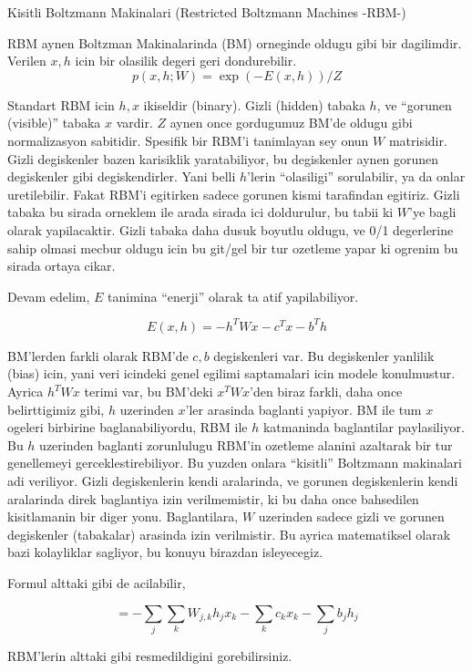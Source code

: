 \documentclass[12pt,fleqn]{article}\usepackage{../common}
\begin{document}
Kisitli Boltzmann Makinalari (Restricted Boltzmann Machines -RBM-)

RBM aynen Boltzman Makinalarinda (BM) orneginde oldugu gibi bir
dagilimdir. Verilen $x,h$ icin bir olasilik degeri geri dondurebilir.
$$ p(x,h;W) = \exp (-E(x,h)) / Z $$

Standart RBM icin $h,x$ ikiseldir (binary). Gizli (hidden) tabaka $h$, ve
``gorunen (visible)'' tabaka $x$ vardir. $Z$ aynen once gordugumuz BM'de
oldugu gibi normalizasyon sabitidir. Spesifik bir RBM'i tanimlayan sey onun
$W$ matrisidir. Gizli degiskenler bazen karisiklik yaratabiliyor, bu
degiskenler aynen gorunen degiskenler gibi degiskendirler. Yani belli
$h$'lerin ``olasiligi'' sorulabilir, ya da onlar uretilebilir. Fakat RBM'i
egitirken sadece gorunen kismi tarafindan egitiriz. Gizli tabaka bu sirada
orneklem ile arada sirada ici doldurulur, bu tabii ki $W$'ye bagli olarak
yapilacaktir. Gizli tabaka daha dusuk boyutlu oldugu, ve 0/1 degerlerine
sahip olmasi mecbur oldugu icin bu git/gel bir tur ozetleme yapar ki
ogrenim bu sirada ortaya cikar.

Devam edelim, $E$ tanimina ``enerji'' olarak ta atif yapilabiliyor.

$$ E(x,h) = -h^TWx - c^Tx - b^Th $$

BM'lerden farkli olarak RBM'de $c,b$ degiskenleri var. Bu degiskenler
yanlilik (bias) icin, yani veri icindeki genel egilimi saptamalari icin
modele konulmustur. Ayrica $h^TWx$ terimi var, bu BM'deki $x^TWx$'den biraz
farkli, daha once belirttigimiz gibi, $h$ uzerinden $x$'ler arasinda
baglanti yapiyor. BM ile tum $x$ ogeleri birbirine baglanabiliyordu, RBM
ile $h$ katmaninda baglantilar paylasiliyor. Bu $h$ uzerinden baglanti
zorunlulugu RBM'in ozetleme alanini azaltarak bir tur genellemeyi
gerceklestirebiliyor. Bu yuzden onlara ``kisitli'' Boltzmann makinalari adi
veriliyor. Gizli degiskenlerin kendi aralarinda, ve gorunen degiskenlerin
kendi aralarinda direk baglantiya izin verilmemistir, ki bu daha once
bahsedilen kisitlamanin bir diger yonu. Baglantilara, $W$ uzerinden sadece
gizli ve gorunen degiskenler (tabakalar) arasinda izin verilmistir. Bu
ayrica matematiksel olarak bazi kolayliklar sagliyor, bu konuyu birazdan
isleyecegiz.

Formul alttaki gibi de acilabilir,

$$ = - \sum_j \sum_k W_{j,k}h_jx_k - \sum_k c_kx_k - \sum_j b_jh_j  $$

RBM'lerin alttaki gibi resmedildigini gorebilirsiniz.
\end{document}
